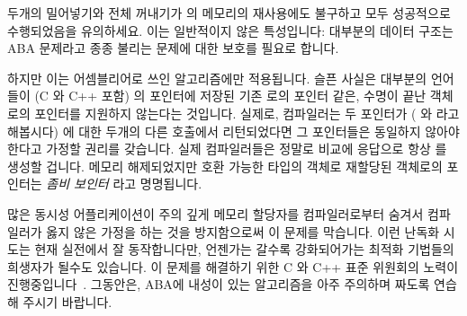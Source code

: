 \begin{fcvref}
\begin{fcvref}
\begin{enumerate}
\fi

\end{enumerate}

두개의 밀어넣기와 전체 꺼내기가  의 메모리의 재사용에도 불구하고 모두
성공적으로 수행되었음을 유의하세요.
이는 일반적이지 않은 특성입니다: 대부분의 데이터 구조는 ABA 문제라고 종종
불리는 문제에 대한 보호를 필요로 합니다.

하지만 이는 어셈블리어로 쓰인 알고리즘에만 적용됩니다.
슬픈 사실은 대부분의 언어들이 (C 와 C++ 포함)  의  포인터에
저장된 기존  로의 포인터 같은, 수명이 끝난 객체로의 포인터를 지원하지
않는다는 것입니다.
실제로, 컴파일러는 두 포인터가 ( 와  라고 해봅시다) 
에 대한 두개의 다른 호출에서 리턴되었다면 그 포인터들은 동일하지 않아야 한다고
가정할 권리를 갖습니다.
실제 컴파일러들은 정말로  비교에 응답으로 항상  를 생성할
겁니다.
메모리 해제되었지만 호환 가능한 타입의 객체로 재할당된 객체로의 포인터는
\emph{좀비 보인터} 라고 명명됩니다.

\iffalse

Note that both pushes and the popall all ran successfully despite the
reuse of \Node{A}'s memory.
This is an unusual property: Most data structures require protection
against what is often called the ABA problem.

But this property holds only for algorithm written in assembly
language.
The sad fact is that most languages (including C and C++) do not support
pointers to lifetime-ended objects, such as the pointer to the old \Node{A}
contained in \Node{B}'s \co{->next} pointer.
In fact, compilers are within their rights to assume that if two pointers
(call them \co{p} and \co{q}) were returned from two different calls to
\co{malloc()}, then those pointers must not be equal.
Real compilers really will generate the constant \co{false} in
response to a \co{p==q} comparison.
A pointer to an object that has been freed, but whose memory has been
reallocated for a compatibly typed object is termed a \emph{zombie pointer}.

\fi

많은 동시성 어플리케이션이 주의 깊게 메모리 할당자를 컴파일러로부터 숨겨서
컴파일러가 옳지 않은 가정을 하는 것을 방지함으로써 이 문제를 막습니다.
이런 난독화 시도는 현재 실전에서 잘 동작합니다만, 언젠가는 갈수록 강화되어가는
최적화 기법들의 희생자가 될수도 있습니다.
이 문제를 해결하기 위한 C 와 C++ 표준 위원회의 노력이
진행중입니다~\cite{PaulEMcKenney2019PointerLifetimeEndZap,PaulEMcKenney2020PointerLifetimeEndZapCpp}.
그동안은, ABA에 내성이 있는 알고리즘을 아주 주의하며 짜도록 연습해 주시기
바랍니다.
\end{fcvref}


\end{fcvref}
